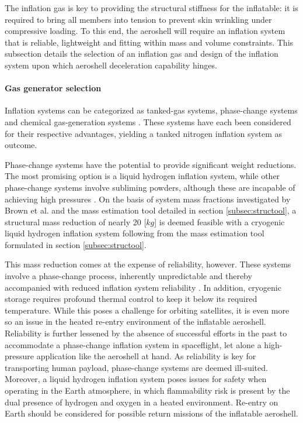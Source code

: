 The inflation gas is key to providing the structural stiffness for the inflatable: it is required to bring all members into tension to prevent skin wrinkling under compressive loading. To this end, the aeroshell will require an inflation system that is reliable, lightweight and fitting within mass and volume constraints. This subsection details the selection of an inflation gas and design of the inflation system upon which aeroshell deceleration capability hinges.

\paragraph{Gas generator selection}
Inflation systems can be categorized as tanked-gas systems, phase-change systems and chemical gas-generation systems \cite{Jenkins2001}. These systems have each been considered for their respective advantages, yielding a tanked nitrogen inflation system as outcome. 

Phase-change systems have the potential to provide significant weight reductions. The most promising option is a liquid hydrogen inflation system, while other phase-change systems involve subliming powders, although these are incapable of achieving high pressures \cite{Freeland1998}.  On the basis of system mass fractions investigated by Brown et al. \cite{Brown2009} and the mass estimation tool detailed in section \ref{subsec:structool}, a structural mass reduction of nearly 20 [$kg$] is deemed feasible with a cryogenic liquid hydrogen inflation system following from the mass estimation tool formulated in section \ref{subsec:structool}. 


This mass reduction comes at the expense of reliability, however. These systems involve a phase-change process, inherently unpredictable and thereby accompanied with reduced inflation system reliability \cite{Jenkins2001}. In addition, cryogenic storage requires profound thermal control to keep it below its required temperature. While this poses a challenge for orbiting satellites, it is even more so an issue in the heated re-entry environment of the inflatable aeroshell. Reliability is further lessened by the absence of successful efforts in the past to accommodate a phase-change inflation system in spaceflight, let alone a high-pressure application like the aeroshell at hand. As reliability is key for transporting human payload, phase-change systems are deemed ill-suited. Moreover, a liquid hydrogen inflation system poses issues for safety when operating in the Earth atmosphere, in which flammability risk is present by the dual presence of hydrogen and oxygen in a heated environment. Re-entry on Earth should be considered for possible return missions of the inflatable aeroshell.


